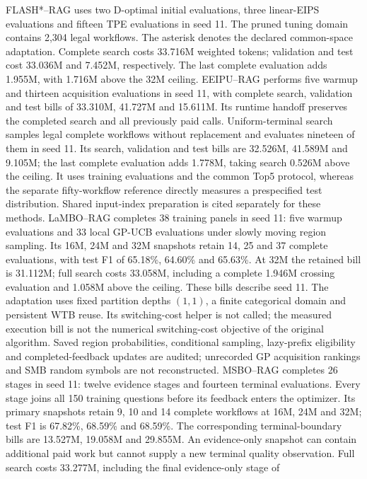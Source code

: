 FLASH*--RAG uses two D-optimal initial evaluations, three linear-EIPS
evaluations and fifteen TPE evaluations in seed 11. The pruned tuning
domain contains 2,304 legal workflows. The asterisk denotes the declared
common-space adaptation. Complete search costs 33.716M weighted tokens;
validation and test cost 33.036M and 7.452M, respectively. The last complete
evaluation adds 1.955M, with 1.716M above the 32M ceiling. EEIPU--RAG performs
five warmup and thirteen acquisition evaluations in seed 11, with complete search,
validation and test bills of 33.310M, 41.727M and 15.611M. Its runtime
handoff preserves the completed search and all previously paid calls.
Uniform-terminal search samples legal complete workflows without replacement
and evaluates nineteen of them in seed 11. Its search, validation and test
bills are 32.526M, 41.589M and 9.105M; the last complete evaluation adds
1.778M, taking search 0.526M above the ceiling. It uses training evaluations
and the common Top5 protocol, whereas the separate fifty-workflow reference
directly measures a prespecified test distribution.
Shared input-index preparation is cited separately for these methods.
LaMBO--RAG completes 38 training panels in seed 11: five warmup evaluations
and 33 local GP-UCB evaluations under slowly moving region sampling.
Its 16M, 24M and 32M snapshots retain 14, 25 and 37 complete evaluations,
with test F1 of 65.18\%, 64.60\% and 65.63\%. At 32M the retained bill
is 31.112M; full search costs 33.058M, including a complete 1.946M
crossing evaluation and 1.058M above the ceiling. These bills describe seed 11.
The adaptation uses fixed partition depths $(1,1)$, a finite categorical
domain and persistent WTB reuse. Its switching-cost helper is not called;
the measured execution bill is not the numerical switching-cost objective
of the original algorithm. Saved region probabilities, conditional sampling,
lazy-prefix eligibility and completed-feedback updates are audited;
unrecorded GP acquisition rankings and SMB random symbols are not reconstructed.
MSBO--RAG completes 26 stages in seed 11: twelve evidence stages and
fourteen terminal evaluations. Every stage joins all 150 training questions
before its feedback enters the optimizer. Its primary snapshots retain
9, 10 and 14 complete workflows at 16M, 24M and 32M; test F1 is
67.82\%, 68.59\% and 68.59\%. The corresponding terminal-boundary bills
are 13.527M, 19.058M and 29.855M. An evidence-only snapshot can contain
additional paid work but cannot supply a new terminal quality observation.
Full search costs 33.277M, including the final evidence-only stage of
